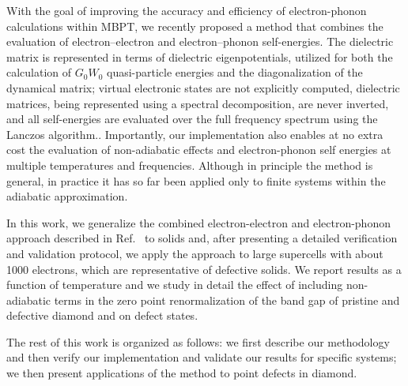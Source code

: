 \documentclass[journal=jctcce,manuscript=article]{achemso}
\begin{document}
With the goal of improving the accuracy and efficiency of electron-phonon calculations within MBPT,  we recently proposed \cite{mcavoy2018coupling} a method that  combines the evaluation  of electron–electron and electron–phonon self-energies. The dielectric matrix is represented in terms of dielectric eigenpotentials\cite{wilson2008efficient,wilson2009iterative}, utilized for both the calculation of $G_0W_0$ quasi-particle energies and the diagonalization of the dynamical matrix; virtual electronic states are not explicitly computed, dielectric matrices, being  represented using a spectral decomposition, are never inverted, and all self-energies are evaluated over the full frequency spectrum using the Lanczos algorithm.\cite{pham2013g,govoni2015large,govoni2018gw100}. Importantly, our implementation also enables at no extra cost the evaluation of non-adiabatic effects and electron-phonon self energies at multiple temperatures and frequencies. Although in principle the method is general, in practice it  has so far been applied only to finite systems within the adiabatic approximation.

In this work, we generalize the combined electron-electron and electron-phonon approach described in  Ref.~ to solids and, after presenting a detailed verification and validation protocol, we apply the approach to large supercells with about 1000 electrons, which are representative of defective solids. We report results as a function of temperature and we study in detail the effect of including non-adiabatic terms in the zero point renormalization of the band gap of pristine and defective diamond and on defect states.

The rest of this work is organized as follows: we first describe our methodology and then verify our implementation and validate our results for specific systems; we then present applications of the method to  point defects in diamond.
\end{document}
